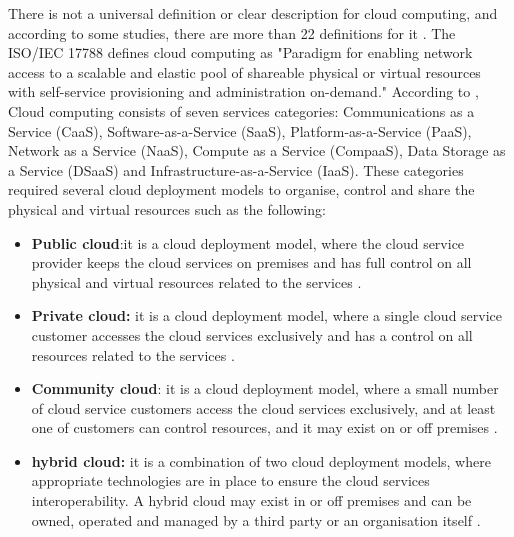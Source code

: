 There is not a universal definition or clear description for cloud computing, and according to some studies, there are more than 22 definitions for it  \cite{Sultan2014}. The ISO/IEC 17788 defines cloud computing as "Paradigm for enabling network access to a scalable and elastic pool of shareable physical or virtual resources with self-service provisioning and administration on-demand."  According to \cite{BSI2014}, Cloud computing consists of seven services categories: Communications as a Service (CaaS), Software-as-a-Service (SaaS), Platform-as-a-Service (PaaS), Network as a Service (NaaS), Compute as a Service (CompaaS), Data Storage as a Service (DSaaS) and Infrastructure-as-a-Service (IaaS). These categories required several cloud deployment models to organise, control and share the physical and virtual resources such as the following: 
\begin{itemize} 
	\item \textbf{Public cloud}:it is a cloud deployment model, where the cloud service provider keeps the cloud services on premises and has full control on all physical and virtual resources related to the services \cite{BSI2014}. %
	
	\item \textbf{Private cloud:} it is a cloud deployment model, where a single cloud service customer accesses the cloud services exclusively and has a control on all resources related to the services  \cite{BSI2014}.%
	
	\item \textbf{Community cloud}: it is a cloud deployment model, where a small number of cloud service customers access the cloud services exclusively, and at least one of customers can control resources, and it may exist on or off premises \cite{BSI2014}.%
	
	\item \textbf{hybrid cloud:} it is a combination of two cloud deployment models, where appropriate technologies are in place to ensure the cloud services interoperability. A hybrid cloud may exist in or off premises and can be owned, operated and managed by a third party or an organisation itself \cite{BSI2014}.
	
\end{itemize}


